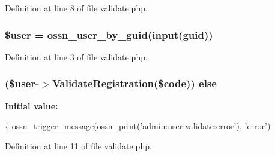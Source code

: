 Definition at line 8 of file validate.\+php.

\subsubsection[{\texorpdfstring{\$user}{$user}}]{\setlength{\rightskip}{0pt plus 5cm}\${\bf user} = {\bf ossn\+\_\+user\+\_\+by\+\_\+guid}({\bf input}(\textquotesingle{}guid\textquotesingle{}))}\hypertarget{validate_8php_a598ca4e71b15a1313ec95f0df1027ca5}{}\label{validate_8php_a598ca4e71b15a1313ec95f0df1027ca5}


Definition at line 3 of file validate.\+php.

\subsubsection[{\texorpdfstring{else}{else}}]{ (\${\bf user}-\/$>$Validate\+Registration(\$code)) else}\hypertarget{validate_8php_a3f9d4ad5dc367c00e2516f0d03431aea}{}\label{validate_8php_a3f9d4ad5dc367c00e2516f0d03431aea}
{\bfseries Initial value\+:}
\begin{DoxyCode}
\{
    \hyperlink{ossn_8lib_8system_8php_ab3f23f23f32f50c12e7aea0ffaccaac7}{ossn\_trigger\_message}(\hyperlink{ossn_8lib_8languages_8php_a2be5d1c4b695593a9b9067b96df2150a}{ossn\_print}(\textcolor{stringliteral}{'admin:user:validate:error'}), \textcolor{stringliteral}{'error'})
\end{DoxyCode}


Definition at line 11 of file validate.\+php.

